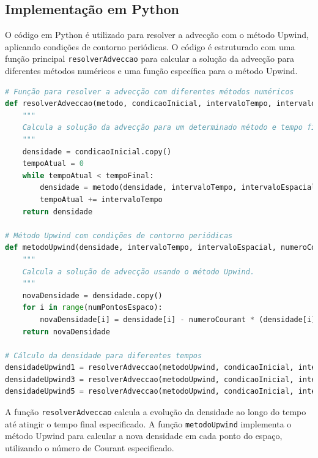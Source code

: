 \subsection{Implementação em Python}

O código em Python é utilizado para resolver a advecção com o método Upwind, aplicando condições de contorno periódicas. O código é estruturado com uma função principal \texttt{resolverAdveccao} para calcular a solução da advecção para diferentes métodos numéricos e uma função específica para o método Upwind.

\begin{lstlisting}[language=Python, caption={Código para resolver a advecção usando o método Upwind}, label={lst:codigo_upwind}]
# Função para resolver a advecção com diferentes métodos numéricos
def resolverAdveccao(metodo, condicaoInicial, intervaloTempo, intervaloEspacial, numeroCourant, tempoFinal):
    """
    Calcula a solução da advecção para um determinado método e tempo final.
    """
    densidade = condicaoInicial.copy()
    tempoAtual = 0
    while tempoAtual < tempoFinal:
        densidade = metodo(densidade, intervaloTempo, intervaloEspacial, numeroCourant)
        tempoAtual += intervaloTempo
    return densidade

# Método Upwind com condições de contorno periódicas
def metodoUpwind(densidade, intervaloTempo, intervaloEspacial, numeroCourant):
    """
    Calcula a solução de advecção usando o método Upwind.
    """
    novaDensidade = densidade.copy()
    for i in range(numPontosEspaco):
        novaDensidade[i] = densidade[i] - numeroCourant * (densidade[i] - densidade[i-1])
    return novaDensidade

# Cálculo da densidade para diferentes tempos
densidadeUpwind1 = resolverAdveccao(metodoUpwind, condicaoInicial, intervaloTempo, intervaloEspacial, numeroCourant, tempoFinal1)
densidadeUpwind3 = resolverAdveccao(metodoUpwind, condicaoInicial, intervaloTempo, intervaloEspacial, numeroCourant, tempoFinal3)
densidadeUpwind5 = resolverAdveccao(metodoUpwind, condicaoInicial, intervaloTempo, intervaloEspacial, numeroCourant, tempoFinal5)
\end{lstlisting}


A função \texttt{resolverAdveccao} calcula a evolução da densidade ao longo do tempo até atingir o tempo final especificado. A função \texttt{metodoUpwind} implementa o método Upwind para calcular a nova densidade em cada ponto do espaço, utilizando o número de Courant especificado.